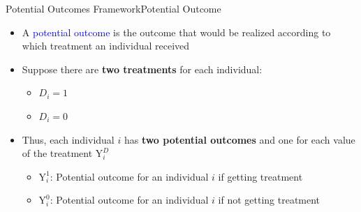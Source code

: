 \documentclass[hyperref={pdfpagelabels=false}]{beamer}
\begin{document}
\begin{frame}{Potential Outcomes Framework}{Potential Outcome}
\begin{itemize} 	
\item A \textcolor{blue}{potential outcome} is the outcome that would be realized according to which treatment an individual received
\vspace{0.2cm}
\item Suppose there are \textbf{two treatments} for each individual: 
\vspace{0.2cm}
\begin{itemize} 	
\item $D_i=1$
\vspace{0.2cm}
\item $D_i=0$ 
\end{itemize}
\vspace{0.2cm}
\item Thus, each individual $i$ has \textbf{two potential outcomes} and one for each value of the treatment	$\mathrm{Y}^{D}_{i}$
\begin{itemize}
\vspace{0.2cm}
\item $\mathrm{Y}^{1}_{i}$: Potential outcome for an individual $i$ if getting treatment
\vspace{0.2cm}
\item $\mathrm{Y}^{0}_{i}$: Potential outcome for an individual  $i$ if not getting treatment
\vspace{0.2cm}
\end{itemize}

\end{itemize}

\end{frame}
\end{document}
